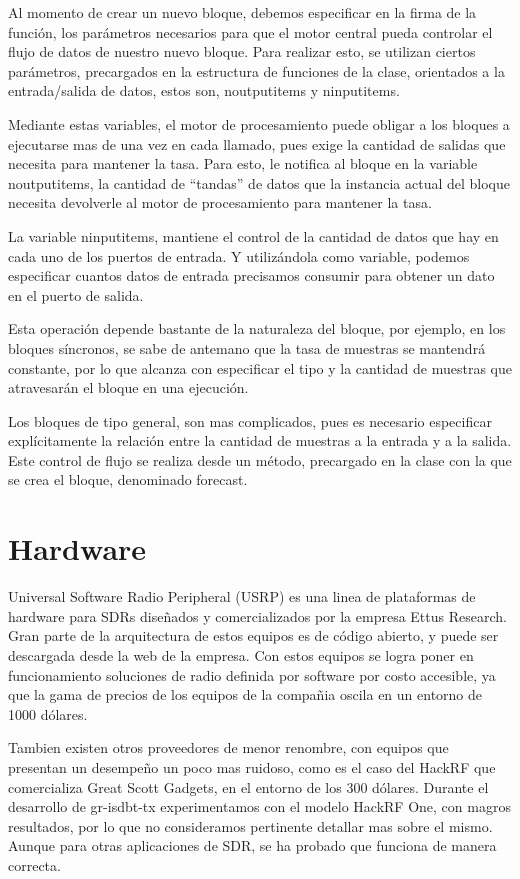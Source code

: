 Al momento de crear un nuevo bloque, debemos especificar en la firma de la función, los parámetros necesarios para que el motor central pueda controlar el flujo de datos de nuestro nuevo bloque. Para realizar esto, se utilizan ciertos parámetros, precargados en la estructura de funciones de la clase, orientados a la entrada/salida de datos, estos son,  noutputitems y ninputitems. 

Mediante estas variables, el motor de procesamiento puede obligar a los bloques a ejecutarse mas de una vez en cada llamado, pues exige la cantidad de salidas que necesita para mantener la tasa. Para esto, le notifica al bloque en la variable noutputitems, la cantidad de “tandas” de datos que la instancia actual del bloque necesita devolverle al motor de procesamiento para mantener la tasa. 

La variable ninputitems, mantiene el control de la cantidad de datos que hay en cada uno de los puertos de entrada. Y utilizándola como variable, podemos especificar cuantos datos de entrada precisamos consumir para obtener un dato en el puerto de salida.

Esta operación depende bastante de la naturaleza del bloque, por ejemplo, en los bloques síncronos, se sabe de antemano que la tasa de muestras se mantendrá constante, por lo que alcanza con especificar el tipo y la cantidad de muestras que atravesarán el bloque en una ejecución. 

Los bloques de tipo general, son mas complicados, pues es necesario especificar explícitamente la relación entre la cantidad de muestras a la entrada y a la salida. Este control de flujo se realiza desde un método, precargado en la clase con la que se crea el bloque, denominado forecast.

\section{Hardware}
Universal Software Radio Peripheral (USRP) es una linea de plataformas de hardware para SDRs diseñados y comercializados por la empresa Ettus Research. Gran parte de la arquitectura de estos equipos es de código abierto, y puede ser descargada desde la web de la empresa. Con estos equipos se logra poner en funcionamiento soluciones de radio definida por software por costo accesible, ya que la gama de precios de los equipos de la compañia oscila en un entorno de 1000 dólares. 

Tambien existen otros proveedores de menor renombre, con equipos que presentan un desempeño un poco mas ruidoso, como es el caso del HackRF que comercializa Great Scott Gadgets\cite{GreatScottGadgets}, en el entorno de los 300 dólares. Durante el desarrollo de gr-isdbt-tx experimentamos con el modelo HackRF One, con magros resultados, por lo que no consideramos pertinente detallar mas sobre el mismo. Aunque para otras aplicaciones de SDR, se ha probado que funciona de manera correcta.

